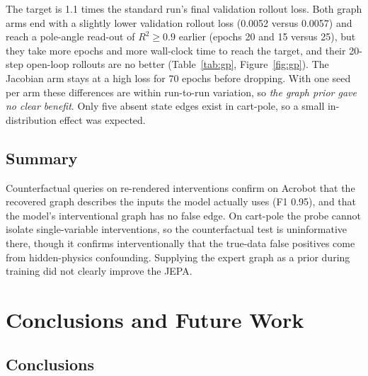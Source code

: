 \documentclass[11pt, a4paper, oneside,enumerate,textcomp]{report}
\newcommand{\Rsq}{R^2}
\begin{document}
The target is 1.1 times the standard run's final validation rollout loss. Both graph arms end with a slightly lower validation rollout loss (0.0052 versus 0.0057) and reach a pole-angle read-out of $\Rsq \geq 0.9$ earlier (epochs 20 and 15 versus 25), but they take more epochs and more wall-clock time to reach the target, and their 20-step open-loop rollouts are no better (Table~\ref{tab:gp}, Figure~\ref{fig:gp}). The Jacobian arm stays at a high loss for 70 epochs before dropping. With one seed per arm these differences are within run-to-run variation, so \emph{the graph prior gave no clear benefit}. Only five absent state edges exist in cart-pole, so a small in-distribution effect was expected.

\section{Summary}

Counterfactual queries on re-rendered interventions confirm on Acrobot that the recovered graph describes the inputs the model actually uses (F1 0.95), and that the model's interventional graph has no false edge. On cart-pole the probe cannot isolate single-variable interventions, so the counterfactual test is uninformative there, though it confirms interventionally that the true-data false positives come from hidden-physics confounding. Supplying the expert graph as a prior during training did not clearly improve the JEPA.


\chapter{Conclusions and Future Work}
\thispagestyle{empty}
\section{Conclusions}
\end{document}
